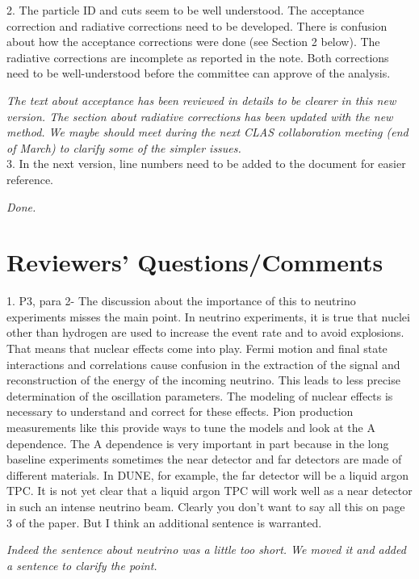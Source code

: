 \documentclass[12pt]{article}
\begin{document}
2.
The particle ID and cuts seem to be well understood.  The acceptance correction and 
radiative corrections need to be developed. There is confusion about how the acceptance 
corrections were done (see Section 2 below). The radiative corrections are incomplete as 
reported in the note.  Both corrections need to be well-understood before the committee can 
approve of the analysis.

{\it The text about acceptance has been reviewed in details to be clearer in this new 
version. The section about radiative corrections has been updated with the new method.
We maybe should meet during the next CLAS collaboration meeting (end of March) to clarify 
some of the simpler issues.} \\

3.
In the next version, line numbers need to be added to the document for easier reference.

{\it Done.} \\

\section{Reviewers’ Questions/Comments}
1.
P3, para 2- The discussion about the importance of this to neutrino experiments misses the 
main point.  In neutrino experiments, it is true that nuclei other than hydrogen are used to 
increase the event rate and to avoid explosions.  That means that nuclear effects come into 
play.  Fermi motion and final state interactions and correlations cause confusion in the 
extraction of the signal and reconstruction of the energy of the incoming neutrino.  This 
leads to less precise determination of the oscillation parameters.  The modeling of nuclear 
effects is necessary to understand and correct for these effects.  Pion production 
measurements like this provide ways to tune the models and look at the A dependence.  The 
A dependence is very important in part because in the long baseline experiments sometimes 
the near detector and far detectors are made of different materials.  In DUNE, for example, 
the far detector will be a liquid argon TPC.  It is not yet clear that a liquid argon TPC will 
work well as a near detector in such an intense neutrino beam.  Clearly you don’t want to 
say all this on page 3 of the paper.  But I think an additional sentence is warranted.

{\it Indeed the sentence about neutrino was a little too short. We moved it and added a 
sentence to clarify the point.}\\
\end{document}
